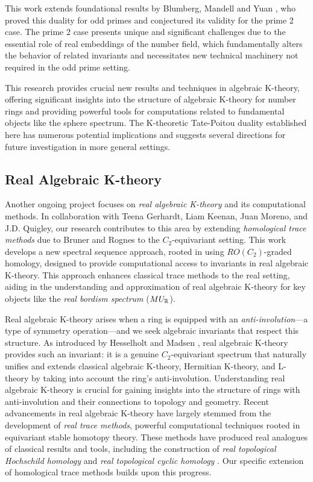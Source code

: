 \documentclass[11pt]{article}
\begin{document}
This work extends foundational results by Blumberg, Mandell and Yuan \cite{MR4121155,BMY}, who proved this duality for odd primes and conjectured its validity for the prime 2 case. The prime 2 case presents unique and significant challenges due to the essential role of real embeddings of the number field, which fundamentally alters the behavior of related invariants and necessitates new technical machinery not required in the odd prime setting.

This research provides crucial new results and techniques in algebraic K-theory, offering significant insights into the structure of algebraic K-theory for number rings and providing powerful tools for computations related to fundamental objects like the sphere spectrum. The K-theoretic Tate-Poitou duality established here has numerous potential implications and suggests several directions for future investigation in more general settings.

\subsection{Real Algebraic K-theory}
Another ongoing project focuses on {\it real algebraic K-theory} and its computational methods. In collaboration with Teena Gerhardt, Liam Keenan, Juan Moreno, and J.D. Quigley, our research contributes to this area by extending {\it homological trace methods} due to Bruner and Rognes \cite{MR2153113} to the $C_2$-equivariant setting. This work develops a new spectral sequence approach, rooted in using $RO(C_2)$-graded homology, designed to provide computational access to invariants in real algebraic K-theory. This approach enhances classical trace methods to the real setting, aiding in the understanding and approximation of real algebraic K-theory for key objects like the {\it real bordism spectrum} ($MU_{\mathbb{R}}$).
 
Real algebraic K-theory arises when a ring is equipped with an {\it anti-involution}—a type of symmetry operation—and we seek algebraic invariants that respect this structure. As introduced by Hesselholt and Madsen \cite{HMreal}, real algebraic K-theory provides such an invariant: it is a genuine $C_2$-equivariant spectrum that naturally unifies and extends classical algebraic K-theory, Hermitian K-theory, and L-theory by taking into account the ring's anti-involution. Understanding real algebraic K-theory is crucial for gaining insights into the structure of rings with anti-involution and their connections to topology and geometry.
Recent advancements in real algebraic K-theory have largely stemmed from the development of {\it real trace methods}, powerful computational techniques rooted in equivariant stable homotopy theory. These methods have produced real analogues of classical results and tools, including the construction of {\it real topological Hochschild homology} \cite{Dotto} and {\it real topological cyclic homology} \cite{Hogenhaven}. Our specific extension of homological trace methods builds upon this progress.
\end{document}
